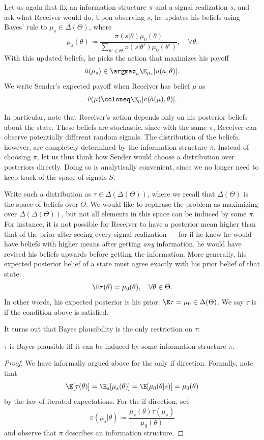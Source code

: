 Let us again first fix an information structure \(\pi\) and a signal realization \(s\), and ask what Receiver would do.
Upon observing \(s\), he updates his beliefs using Bayes' rule to \(\mu_s \in \Delta(\Theta)\), where
\[
  \mu_s(\theta)
  \coloneq \frac{\pi(s | \theta) \mu_0(\theta)}{\sum_{\theta' \in \Theta} \pi(s | \theta') \mu_0(\theta')}, \quad \forall \theta.
\]
With this updated beliefs, he picks the action that maximizes his payoff
\[
  \hat{a}(\mu_s) \in \argmax_a \E_{\mu_s}[u(a, \theta)].
\]
We write Sender's expected payoff when Receiver has belief \(\mu\) as
\[
  \hat{v}(\mu) \coloneq \E_\mu[v(\hat{a}(\mu), \theta)].
\]

In particular, note that Receiver's action depends only on his posterior beliefs about the state.
These beliefs are stochastic, since with the same \(\pi\), Receiver can observe potentially different random signals.
The distribution of the beliefs, however, are completely determined by the information structure \(\pi\).
Instead of choosing \(\pi\), let us thus think how Sender would choose a distribution over posteriors directly.
Doing so is analytically convenient, since we no longer need to keep track of the space of signals \(S\).

Write such a distribution as \(\tau \in \Delta(\Delta(\Theta))\), where we recall that \(\Delta(\Theta)\) is the space of beliefs over \(\Theta\).
We would like to rephrase the problem as maximizing over \(\Delta(\Delta(\Theta))\), but not all elements in this space can be induced by some \(\pi\).
For instance, it is not possible for Receiver to have a posterior mean higher than that of the prior after seeing every signal realization --- for if he knew he would have beliefs with higher means after getting \emph{any} information, he would have revised his beliefs upwards before getting the information.
More generally, his expected posterior belief of a state must agree exactly with his prior belief of that state:
\[
  \E \tau(\theta)
  = \mu_0(\theta), \quad \forall \theta \in \Theta.
\]
In other words, his expected posterior is his prior: \(\E \tau = \mu_0 \in \Delta(\Theta)\).
We say \(\tau\) is  if the condition above is satisfied.

It turns out that Bayes plausibility is the only restriction on \(\tau\):
\begin{lemma}
  \(\tau\) is Bayes plausible iff it can be induced by some information structure \(\pi\).
\end{lemma}
\begin{proof}
  We have informally argued above for the only if direction.
  Formally, note that
  \[
    \E[\tau(\theta)]
    = \E_s[\mu_s(\theta)]
    = \E[\mu_0(\theta|s)]
    = \mu_0(\theta)
  \]
  by the law of iterated expectations.
  For the if direction, set
  \[
    \pi(\mu_s|\theta)
    \coloneq \frac{\mu_s(\theta) \tau(\mu_s)}{\mu_0(\theta)}
  \]
  and observe that \(\pi\) describes an information structure.
\end{proof}

